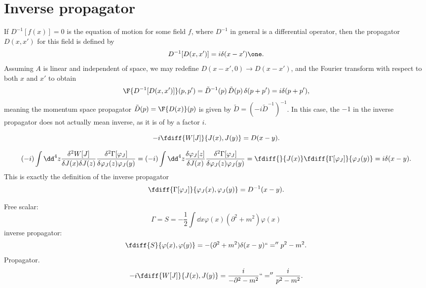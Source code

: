 \documentclass{article}
\begin{document}
\section{Inverse propagator}
If $D^{-1}[f(x)] = 0$ is the equation of motion for some field $f$, where $D^{-1}$ in general is a differential operator, then the propagator $D(x, x')$ for this field is defined by
\begin{align*}
    D^{-1}[D(x, x')] = i \delta(x - x') \one.
\end{align*}
Assuming $A$ is linear and independent of space, we may redefine $D(x - x', 0) \rightarrow D(x - x')$, and the Fourier transform with respect to both $x$ and $x'$ to obtain
\begin{align*}
    \F{D^{-1}[D(x, x')]}(p, p') 
    = \tilde D^{-1}(p) \, \tilde D(p) \, \delta(p + p')
    = i \delta(p + p'),
\end{align*}
meaning the momentum space propagator $\tilde D(p) = \F{D(x)}(p)$ is given by $\tilde D =  ( - i \tilde  D^{-1})^{-1}$.
In this case, the $-1$ in the inverse propagator does not actually mean inverse, as it is of by a factor $i$.

\begin{equation}
    -i \fdiff{W[J]}{J(x),J(y)} = D(x - y).
\end{equation}

\begin{align}
    \label{Effective action inverse propagator}
    (-i)\int \dd^4 z \frac{\delta^2 W[J]}{\delta J(x) \delta J(z)} 
    \frac{\delta^2 \Gamma[\varphi_J]}{\delta \varphi_J(z) \varphi_J(y)}
    =
    (-i)\int \dd^4 z \frac{\delta \varphi_J[z]}{\delta J(x)}
    \frac{\delta^2 \Gamma[\varphi_J]}{\delta \varphi_J(z) \varphi_J(y)}
    =
    \fdiff{}{J(x)}  \fdiff{\Gamma[\varphi_J]}{\varphi_J(y)}
    = i\delta(x - y).
\end{align}
This is exactly the definition of the inverse propagator
\begin{equation}
    \fdiff{\Gamma[\varphi_J]}{\varphi_J(x),\varphi_J(y)} = D^{-1}(x-y).
\end{equation}

Free scalar:
\begin{equation}
    \Gamma = S = - \frac{1}{2} \int \dd x \varphi(x) (\partial^2 + m^2) \varphi(x)
\end{equation}
inverse propagator:
\begin{equation}
    \fdiff{S}{\varphi(x),\varphi(y)}
    =
    - (\partial^2+m^2)\delta(x - y)
    ``=''
    p^2 - m^2.
\end{equation}
Propagator.
\begin{equation}
    -i \fdiff{W[J]}{J(x),J(y)}
    = \frac{i}{- \partial^2 - m^2}
    ``=''
    \frac{i}{p^2 - m^2}.
\end{equation}
\end{document}
